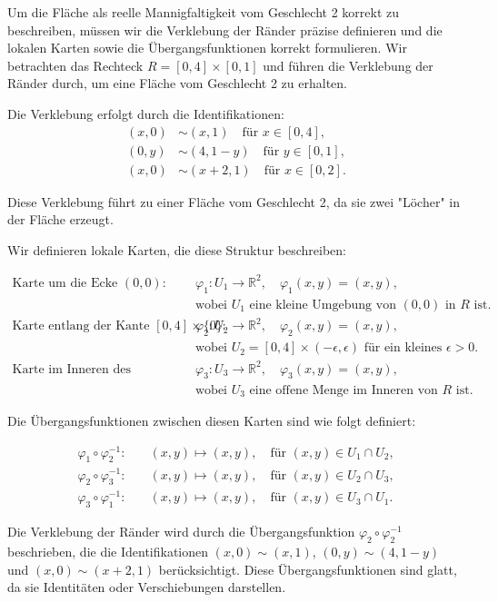 Um die Fläche als reelle Mannigfaltigkeit vom Geschlecht 2 korrekt zu beschreiben, müssen wir die Verklebung der Ränder präzise definieren und die lokalen Karten sowie die Übergangsfunktionen korrekt formulieren. Wir betrachten das Rechteck $R = [0, 4] \times [0, 1]$ und führen die Verklebung der Ränder durch, um eine Fläche vom Geschlecht 2 zu erhalten.

Die Verklebung erfolgt durch die Identifikationen:
\begin{align*}
(x, 0) &\sim (x, 1) \quad \text{für } x \in [0, 4], \\
(0, y) &\sim (4, 1-y) \quad \text{für } y \in [0, 1], \\
(x, 0) &\sim (x+2, 1) \quad \text{für } x \in [0, 2].
\end{align*}

Diese Verklebung führt zu einer Fläche vom Geschlecht 2, da sie zwei "Löcher" in der Fläche erzeugt.

Wir definieren lokale Karten, die diese Struktur beschreiben:

\begin{align*}
\text{Karte um die Ecke } (0,0): \quad & \varphi_1: U_1 \to \mathbb{R}^2, \quad \varphi_1(x,y) = (x,y), \\
& \text{wobei } U_1 \text{ eine kleine Umgebung von } (0,0) \text{ in } R \text{ ist.} \\
\text{Karte entlang der Kante } [0,4] \times \{0\}: \quad & \varphi_2: U_2 \to \mathbb{R}^2, \quad \varphi_2(x,y) = (x,y), \\
& \text{wobei } U_2 = [0,4] \times (-\epsilon, \epsilon) \text{ für ein kleines } \epsilon > 0. \\
\text{Karte im Inneren des Rechtecks:} \quad & \varphi_3: U_3 \to \mathbb{R}^2, \quad \varphi_3(x,y) = (x,y), \\
& \text{wobei } U_3 \text{ eine offene Menge im Inneren von } R \text{ ist.}
\end{align*}

Die Übergangsfunktionen zwischen diesen Karten sind wie folgt definiert:

\begin{align*}
\varphi_1 \circ \varphi_2^{-1}: \quad & (x,y) \mapsto (x,y), \quad \text{für } (x,y) \in U_1 \cap U_2, \\
\varphi_2 \circ \varphi_3^{-1}: \quad & (x,y) \mapsto (x,y), \quad \text{für } (x,y) \in U_2 \cap U_3, \\
\varphi_3 \circ \varphi_1^{-1}: \quad & (x,y) \mapsto (x,y), \quad \text{für } (x,y) \in U_3 \cap U_1.
\end{align*}

Die Verklebung der Ränder wird durch die Übergangsfunktion $\varphi_2 \circ \varphi_2^{-1}$ beschrieben, die die Identifikationen $(x, 0) \sim (x, 1)$, $(0, y) \sim (4, 1-y)$ und $(x, 0) \sim (x+2, 1)$ berücksichtigt. Diese Übergangsfunktionen sind glatt, da sie Identitäten oder Verschiebungen darstellen.

